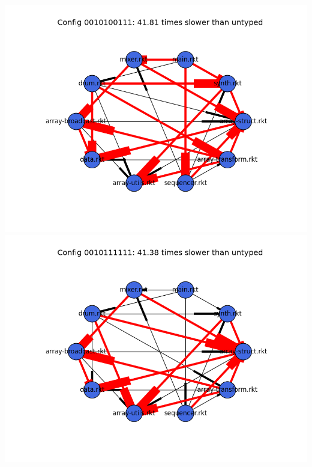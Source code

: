 \documentclass{article}
\begin{document}
\begin{itemize}
\includegraphics[width=\textwidth]{funkytown-module-graph-0010100111.png}
\includegraphics[width=\textwidth]{funkytown-module-graph-0010111111.png}
\end{itemize}
\end{document}
